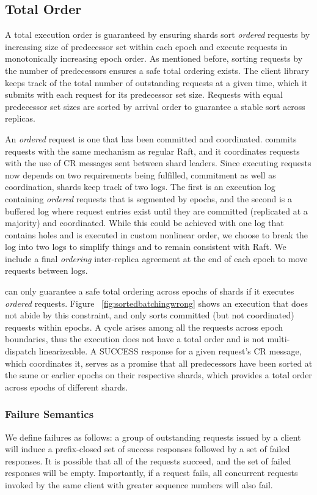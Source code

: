\subsection{Total Order}
A total execution order is guaranteed by ensuring shards sort \textit{ordered} requests by increasing size of predecessor set within each epoch and execute requests in monotonically increasing epoch order. As mentioned before, sorting requests by the number of predecessors ensures a safe total ordering exists. The client library keeps track of the total number of outstanding requests at a given time, which it submits with each request for its predecessor set size. Requests with equal predecessor set sizes are sorted by arrival order to guarantee a stable sort across replicas.

An \textit{ordered} request is one that has been committed and coordinated. \md commits requests with the same mechanism as regular Raft, and it coordinates requests with the use of CR messages sent between shard leaders. Since executing requests now depends on two requirements being fulfilled, commitment as well as coordination, shards keep track of two logs. The first is an execution log containing \textit{ordered} requests that is segmented by epochs, and the second is a buffered log where request entries exist until they are committed (replicated at a majority) and coordinated. While this could be achieved with one log that contains holes and is executed in custom nonlinear order, we choose to break the log into two logs to simplify things and to remain consistent with Raft. We include a final \textit{ordering} inter-replica agreement at the end of each epoch to move requests between logs.

\md can only guarantee a safe total ordering across epochs of shards if it executes \textit{ordered} requests. Figure ~\ref{fig:sortedbatchingwrong} shows an execution that does not abide by this constraint, and only sorts committed (but not coordinated) requests within epochs. A cycle arises among all the requests across epoch boundaries, thus the execution does not have a total order and is not multi-dispatch linearizeable. A SUCCESS response for a given request's CR message, which coordinates it, serves as a promise that all predecessors have been sorted at the same or earlier epochs on their respective shards, which provides a total order across epochs of different shards.

\subsubsection{Failure Semantics}
We define \mdl failures as follows: a group of outstanding requests issued by a client will induce a prefix-closed set of success responses followed by a set of failed responses. It is possible that all of the requests succeed, and the set of failed responses will be empty. Importantly, if a request fails, all concurrent requests invoked by the same client with greater sequence numbers will also fail.


